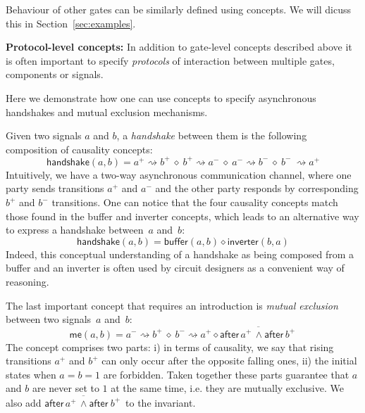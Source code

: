 \documentclass[british, journal]{IEEEtran}
\begin{document}
Behaviour of other gates can be similarly defined using concepts. We will dicuss
this in Section~\ref{sec:examples}.

\textbf{Protocol-level concepts:} In addition to gate-level concepts
described above it is often important to specify \emph{protocols}
of interaction between multiple gates, components or signals. 

Here we demonstrate how one can use concepts to specify asynchronous handshakes
and mutual exclusion mechanisms.

Given two signals $a$ and $b$, a \emph{handshake} between them is
the following composition of causality concepts:
\[
\mathsf{handshake}(a, b)=a^{+}\!\rightsquigarrow\! b^{+}\ \diamond\
b^{+}\!\rightsquigarrow\! a^{-}\ \diamond\ a^{-}\!\rightsquigarrow\! b^{-}\
\diamond\ b^{-}\ \rightsquigarrow\! a^{+}
\]
Intuitively, we have a two-way asynchronous communication channel,
where one party sends transitions $a^{+}$ and $a^{-}$ and the other
party responds by corresponding $b^{+}$ and $b^{-}$ transitions.
One can notice that the four causality concepts match those found
in the buffer and inverter concepts, which leads to an alternative
way to express a handshake between~$a$ and~$b$:
\[
\mathsf{handshake}(a, b)=\mathsf{buffer}(a, b) \diamond\mathsf{inverter}(b, a)
\]
Indeed, this conceptual understanding of a handshake as being composed
from a buffer and an inverter is often used by circuit designers as
a convenient way of reasoning.

%

The last important concept that requires an introduction is \emph{mutual
exclusion} between two signals~$a$ and~$b$:
\[
\mathsf{me}(a, b) = a^{-}\rightsquigarrow b^{+}\ \diamond\ b^{-}\rightsquigarrow
a^{+}\diamond\overline{\mathsf{after}\,a^{+} \, \wedge\mathsf{after}\,b^{+}\, }
\]
The concept comprises two parts: i) in terms of causality, we say
that rising transitions $a^{+}$ and $b^{+}$ can only occur after
the opposite falling ones, ii) the initial states when $a=b=1$ are
forbidden. Taken together these parts guarantee that $a$ and
$b$ are never set to $1$ at the same time, i.e. they are mutually
exclusive. We also add $\overline{\mathsf{after}\, a^{+} \,
\wedge\mathsf{after}\ b^{+}\,}$
to the invariant.
\end{document}
